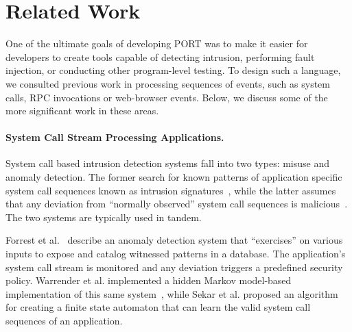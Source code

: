 \section{Related Work}
\label{SEC:related-work}

One of the ultimate goals of developing PORT
was to make it easier for developers to
create tools capable of detecting intrusion,
performing fault injection,
or conducting other program-level testing.
To design such a language,
we consulted
previous work
in processing sequences of events, such as
system calls, RPC invocations or
web-browser events.
Below, we discuss some of the more significant work in these areas.

\paragraph{System Call Stream Processing Applications.}

System call based intrusion detection systems fall into two types: misuse and anomaly detection.
The former search for known patterns of application specific
system call
sequences known as intrusion signatures~\cite{GARCIATEODORO200918}, while
the latter assumes that
any deviation
from ``normally observed'' system call sequences is
malicious~\cite{DBLP:conf/sp/ForrestHSL96}.
The two systems are typically used in tandem. 

Forrest et al.~\cite{DBLP:conf/sp/ForrestHSL96} describe
an anomaly detection system that
``exercises'' on various inputs to expose and catalog  witnessed patterns  in a database.
The application's system call stream
is monitored and any
deviation triggers a
predefined security policy.
Warrender et al. implemented a hidden Markov model-based implementation of this same system~\cite{DBLP:conf/sp/WarrenderFP99},
while
Sekar et al.\cite{DBLP:conf/sp/SekarBDB01} proposed
an algorithm
for creating a finite state automaton that can learn the valid system
call sequences of an application.


